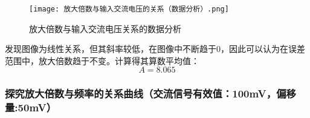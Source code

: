 \documentclass[dvipsnames, svgnames,a4paper,11pt]{article}
\begin{document}
		\begin{figure}[htbp]
			\centering
			\texttt{[image: 放大倍数与输入交流电压的关系（数据分析）.png]}
			\caption{放大倍数与输入交流电压关系的数据分析}
			\label{fig:放大倍数与输入交流电压关系的数据分析}
		\end{figure}

		发现图像为线性关系，但其斜率较低，在图像中不断趋于0，因此可以认为在误差范围中，放大倍数趋于不变。计算得其算数平均值：
		\begin{equation}
			A=8.065
			\label{eq:放大倍数}
		\end{equation}

		\subsubsection{探究放大倍数与频率的关系曲线（交流信号有效值：100mV，偏移量:50mV）}
\end{document}
